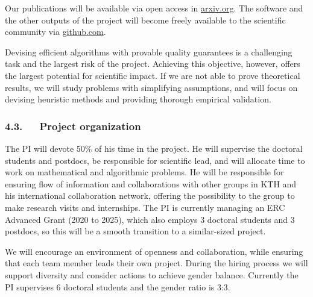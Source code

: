 \documentclass[a4paper,11pt]{article}
\begin{document}
Our publications will be available via open access in {\small\url{arxiv.org}}. 
The software and the other outputs of the project 
will become freely available to the scientific community via {\small\url{github.com}}.

Devising efficient algorithms with provable quality guarantees is a challenging task
and the largest risk of the project. 
Achieving this objective, however, offers the largest potential for scientific impact.
If we are not able to prove theoretical results, 
we will study problems with simplifying assumptions, and 
will focus on devising heuristic methods and providing thorough empirical validation.

\subsubsection*{4.3.~~~Project organization}
\vspace{-1mm}


The PI will devote 50\% of his time in the project. 
He will supervise the doctoral students and postdocs, 
be responsible for scientific lead, 
and will allocate time to work on mathematical and algorithmic problems.
He will be responsible for ensuring flow of information and collaborations
with other groups in KTH and his international collaboration network, 
offering the possibility to the group to make research visits and internships.
The PI is currently managing an ERC Advanced Grant (2020 to 2025),
which also employs 3 doctoral students and 3 postdocs, 
so this will be a smooth transition to a similar-sized project.

We will encourage an environment of openness and collaboration, 
while ensuring that each team member leads their own project.
%
During the hiring process we will support diversity and consider actions to achieve gender balance. 
Currently the PI supervises 6 doctoral students and the gender ratio is 3:3.
\end{document}
